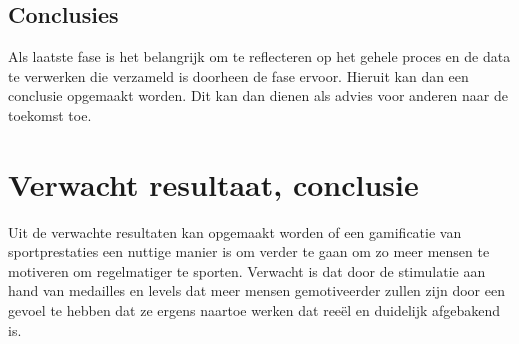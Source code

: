 \subsection{Conclusies}
\label{subsub:conclusies}

Als laatste fase is het belangrijk om te reflecteren op het gehele proces en de data te verwerken die verzameld is doorheen de fase ervoor. Hieruit kan dan een conclusie opgemaakt worden. Dit kan dan dienen als advies voor anderen naar de toekomst toe. 



\section{Verwacht resultaat, conclusie}%
\label{sec:verwachte_resultaten}

Uit de verwachte resultaten kan opgemaakt worden of een gamificatie van sportprestaties een nuttige manier is om verder te gaan om zo meer mensen te motiveren om regelmatiger te sporten. Verwacht is dat door de stimulatie aan hand van medailles en levels dat meer mensen gemotiveerder zullen zijn door een gevoel te hebben dat ze ergens naartoe werken dat reeël en duidelijk afgebakend is.
